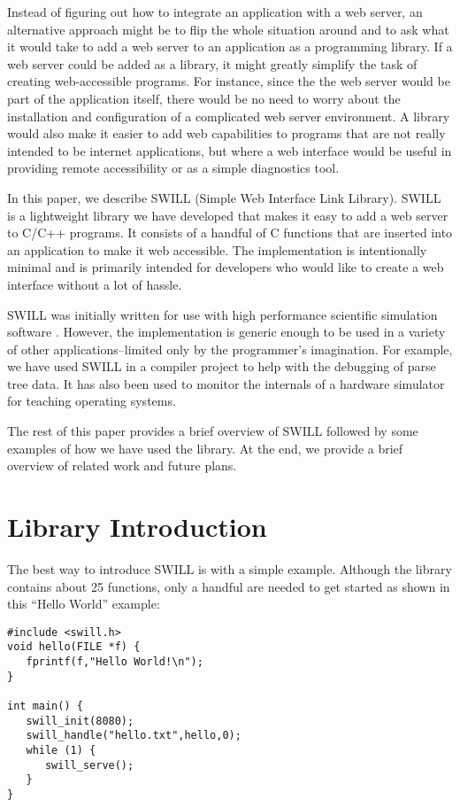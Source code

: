 Instead of figuring out how to integrate an application with a
web server, an alternative approach might be to flip the
whole situation around and to ask what it would take to
add a web server to an application as a programming library.  If a web
server could be added as a library, it might greatly simplify the task
of creating web-accessible programs.  
For instance, since the the web
server would be part of the application itself, there would be no need
to worry about the installation and configuration of a complicated web
server environment.  A library would also make it easier to add web
capabilities to programs that are not really intended to be internet
applications, but where a web interface would be useful in providing
remote accessibility or as a simple diagnostics tool.

In this paper, we describe SWILL (Simple Web Interface Link Library).
SWILL is a lightweight library we have developed that makes it easy to
add a web server to C/C++ programs. It consists of a handful of C
functions that are inserted into an application to make it web
accessible. The implementation is intentionally minimal and is
primarily intended for developers who would like to create a web
interface without a lot of hassle.

SWILL was initially written for use with high performance scientific
simulation software \cite{beazley1}.   However, the implementation is generic enough to be
used in a variety of other applications--limited only by the
programmer's imagination.   For example, we have used SWILL in a
compiler project to help with the debugging of parse tree data.
It has also been used to monitor the internals of a hardware simulator
for teaching operating systems.

The rest of this paper provides a brief overview of SWILL followed by
some examples of how we have used the library.  At the end, we provide
a brief overview of related work and future plans.

\section{Library Introduction}

The best way to introduce SWILL is with a simple example.  Although
the library contains about 25 functions, only a handful are needed to
get started as shown in this ``Hello World'' example:

\begin{verbatim}
#include <swill.h>
void hello(FILE *f) {
   fprintf(f,"Hello World!\n");
}

int main() {
   swill_init(8080);
   swill_handle("hello.txt",hello,0);
   while (1) {
      swill_serve();
   }
}
\end{verbatim}


